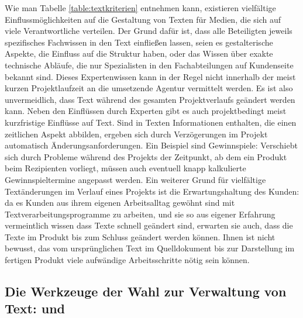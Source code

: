 Wie man Tabelle \ref{table:textkriterien} entnehmen kann, existieren vielfältige Einflussmöglichkeiten auf die Gestaltung von Texten für Medien, die sich auf viele Verantwortliche verteilen. Der Grund dafür ist, dass alle Beteiligten jeweils spezifisches Fachwissen in den Text einfließen lassen, seien es gestalterische Aspekte, die Einfluss auf die Struktur haben, oder das Wissen über exakte technische Abläufe, die nur Spezialisten in den Fachabteilungen auf Kundenseite bekannt sind. Dieses Expertenwissen kann in der Regel nicht innerhalb der meist kurzen Projektlaufzeit an die umsetzende Agentur vermittelt werden. Es ist also unvermeidlich, dass Text während des gesamten Projektverlaufs geändert werden kann. Neben den Einflüssen durch Experten gibt es auch projektbedingt meist kurzfristige Einflüsse auf Text. Sind in Texten Informationen enthalten, die einen zeitlichen Aspekt abbilden, ergeben sich durch Verzögerungen im Projekt automatisch Änderungsanforderungen. Ein Beispiel sind Gewinnspiele: Verschiebt sich durch Probleme während des Projekts der Zeitpunkt, ab dem ein Produkt beim Rezipienten vorliegt, müssen auch eventuell knapp kalkulierte Gewinnspieltermine angepasst werden. Ein weiterer Grund für vielfältige Textänderungen im Verlauf eines Projekts ist die Erwartungshaltung des Kunden: da es Kunden aus ihrem eigenen Arbeitsalltag gewöhnt sind mit Textverarbeitungsprogramme zu arbeiten, und sie so aus eigener Erfahrung vermeintlich wissen dass Texte schnell geändert sind, erwarten sie auch, dass die Texte im Produkt bis zum Schluss geändert werden können. Ihnen ist nicht bewusst, das vom ursprünglichen Text im Quelldokument bis zur Darstellung im fertigen Produkt viele aufwändige Arbeitsschritte nötig sein können.

\subsection{Die Werkzeuge der Wahl zur Verwaltung von Text:  und }\label{l:werkzeugwahl}

